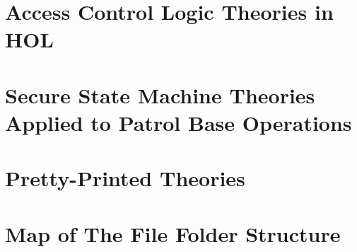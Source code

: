 \documentclass[hidelinks,12pt,a4paper]{report}
\begin{document}
\begin{appendices}
\chapter{Access Control Logic Theories in HOL}
\chapter{Secure State Machine Theories Applied to Patrol Base Operations}
\chapter{Pretty-Printed Theories}
\chapter{Map of The File Folder Structure}
\end{appendices}\cleardoublepage



\doublespacing
\end{document}

